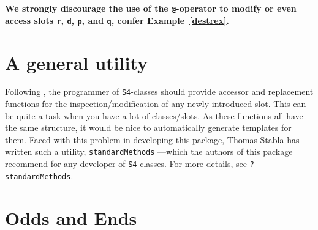 \documentclass[11pt]{article}
\newcommand{\code}[1]{{\tt #1}}
\begin{document}
\begin{itemize}
{\bf We strongly discourage the use of the \code{@}-operator to modify
or even access slots \code{r}, \code{d}, \code{p}, and \code{q}, confer
Example~{\ref{destrex}}.}
\end{itemize}
%
\section{A general utility}
%
Following \cite{OOPGent}, the programmer of {\tt S4}-classes should provide
accessor and replacement functions for the inspection/modification of
any newly introduced slot. This can be quite a task when you have a 
lot of classes/slots.
As these functions all have the same structure, it would be nice
to automatically generate templates for them.
Faced with this problem in developing this package, Thomas Stabla
has written such a utility, \code{standardMethods} ---which the authors
of this package recommend for any developer of {\tt S4}-classes.
For more details, see \code{?standardMethods}.

\section{Odds and Ends}
\end{document}
